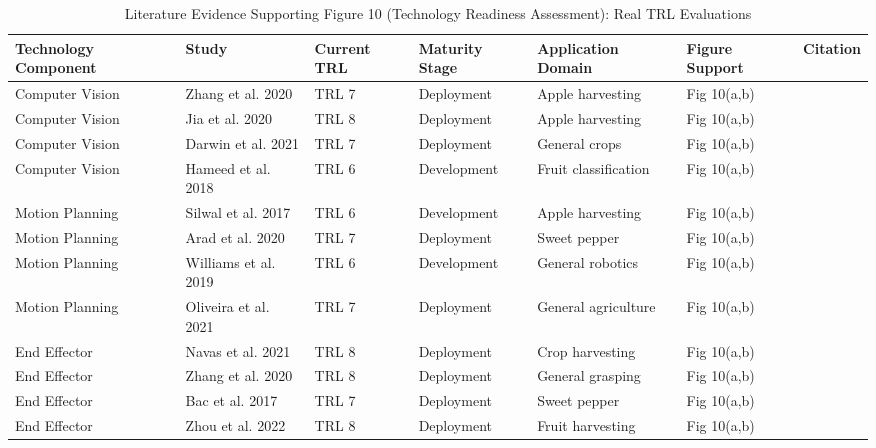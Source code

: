 \begin{table*}[htbp]
\centering
\small
\caption{Literature Evidence Supporting Figure 10 (Technology Readiness Assessment): Real TRL Evaluations}
\label{tab:figure10_support}
\begin{tabular}{p{}p{}p{}p{}p{}p{}p{}}
\toprule
\textbf{Technology Component} & \textbf{Study} & \textbf{Current TRL} & \textbf{Maturity Stage} & \textbf{Application Domain} & \textbf{Figure Support} & \textbf{Citation} \\ \midrule
Computer Vision & Zhang et al. 2020 & TRL 7 & Deployment & Apple harvesting & Fig 10(a,b) & \cite{zhang2020technology} \\
Computer Vision & Jia et al. 2020 & TRL 8 & Deployment & Apple harvesting & Fig 10(a,b) & \cite{jia2020apple} \\
Computer Vision & Darwin et al. 2021 & TRL 7 & Deployment & General crops & Fig 10(a,b) & \cite{darwin2021recognition} \\
Computer Vision & Hameed et al. 2018 & TRL 6 & Development & Fruit classification & Fig 10(a,b) & \cite{hameed2018comprehensive} \\
Motion Planning & Silwal et al. 2017 & TRL 6 & Development & Apple harvesting & Fig 10(a,b) & \cite{silwal2017design} \\
Motion Planning & Arad et al. 2020 & TRL 7 & Deployment & Sweet pepper & Fig 10(a,b) & \cite{arad2020development} \\
Motion Planning & Williams et al. 2019 & TRL 6 & Development & General robotics & Fig 10(a,b) & \cite{williams2019robotic} \\
Motion Planning & Oliveira et al. 2021 & TRL 7 & Deployment & General agriculture & Fig 10(a,b) & \cite{oliveira2021advances} \\
End Effector & Navas et al. 2021 & TRL 8 & Deployment & Crop harvesting & Fig 10(a,b) & \cite{navas2021soft} \\
End Effector & Zhang et al. 2020 & TRL 8 & Deployment & General grasping & Fig 10(a,b) & \cite{zhang2020state} \\
End Effector & Bac et al. 2017 & TRL 7 & Deployment & Sweet pepper & Fig 10(a,b) & \cite{bac2017performance} \\
End Effector & Zhou et al. 2022 & TRL 8 & Deployment & Fruit harvesting & Fig 10(a,b) & \cite{zhou2022intelligent} \\
\bottomrule
\end{tabular}
\end{table*}
